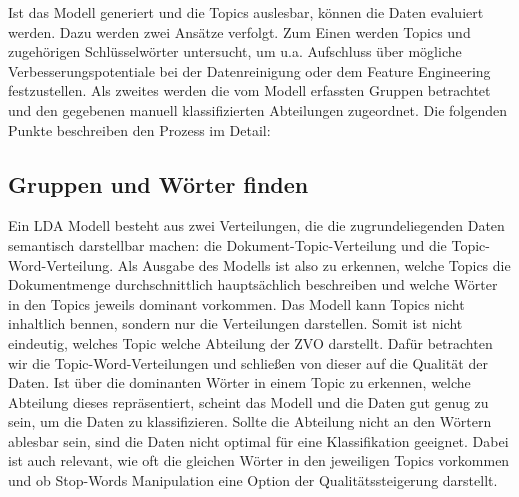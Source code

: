 \documentclass[german,version-2020-11]{uzl-thesis}
\begin{document}
Ist das Modell generiert und die Topics auslesbar, können die Daten evaluiert werden. Dazu werden zwei Ansätze verfolgt. Zum Einen werden Topics und zugehörigen Schlüsselwörter untersucht, um u.a. Aufschluss über mögliche Verbesserungspotentiale bei der Datenreinigung oder dem Feature Engineering festzustellen. Als zweites werden die vom Modell erfassten Gruppen betrachtet und den gegebenen manuell klassifizierten Abteilungen zugeordnet. Die folgenden Punkte beschreiben den Prozess im Detail: \\

\subsection{Gruppen und Wörter finden}
Ein LDA Modell besteht aus zwei Verteilungen, die die zugrundeliegenden Daten semantisch darstellbar machen: die Dokument-Topic-Verteilung und die Topic-Word-Verteilung. Als Ausgabe des Modells ist also zu erkennen, welche Topics die Dokumentmenge durchschnittlich hauptsächlich beschreiben und welche Wörter in den Topics jeweils dominant vorkommen. Das Modell kann Topics nicht inhaltlich bennen, sondern nur die Verteilungen darstellen. Somit ist nicht eindeutig, welches Topic welche Abteilung der ZVO darstellt. Dafür betrachten wir die Topic-Word-Verteilungen und schließen von dieser auf die Qualität der Daten. Ist über die dominanten Wörter in einem Topic zu erkennen, welche Abteilung dieses repräsentiert, scheint das Modell und die Daten gut genug zu sein, um die Daten zu klassifizieren. Sollte die Abteilung nicht an den Wörtern ablesbar sein, sind die Daten nicht optimal für eine Klassifikation geeignet. Dabei ist auch relevant, wie oft die gleichen Wörter in den jeweiligen Topics vorkommen und ob Stop-Words Manipulation eine Option der Qualitätssteigerung darstellt.

\end{document}
